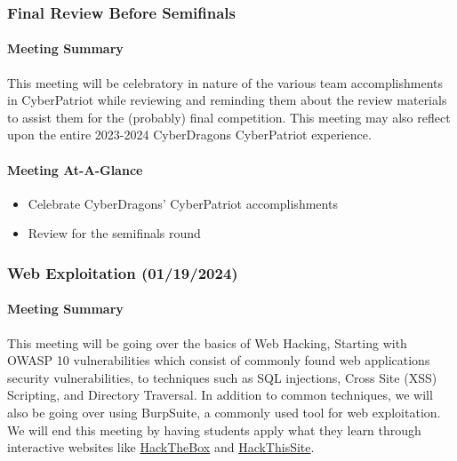 \documentclass[
  letterpaper,
  DIV=11,
  numbers=noendperiod]{scrartcl}
\let\oldparagraph\paragraph
\renewcommand{\paragraph}[1]{\oldparagraph{#1}\mbox{}}
\providecommand{\tightlist}{%
  \setlength{\itemsep}{0pt}\setlength{\parskip}{0pt}}\usepackage{longtable,booktabs,array}
\begin{document}
\newpage{}

\hypertarget{final-review-before-semifinals}{%
\subsubsection{Final Review Before
Semifinals}\label{final-review-before-semifinals}}

\hypertarget{meeting-summary-12}{%
\paragraph{Meeting Summary}\label{meeting-summary-12}}

This meeting will be celebratory in nature of the various team
accomplishments in CyberPatriot while reviewing and reminding them about
the review materials to assist them for the (probably) final
competition. This meeting may also reflect upon the entire 2023-2024
CyberDragons CyberPatriot experience.

\hypertarget{meeting-at-a-glance-12}{%
\paragraph{Meeting At-A-Glance}\label{meeting-at-a-glance-12}}

\begin{itemize}
\tightlist
\item
  Celebrate CyberDragons' CyberPatriot accomplishments
\item
  Review for the semifinals round
\end{itemize}

\hypertarget{web-exploitation-01192024}{%
\subsubsection{Web Exploitation
(01/19/2024)}\label{web-exploitation-01192024}}

\hypertarget{meeting-summary-13}{%
\paragraph{Meeting Summary}\label{meeting-summary-13}}

This meeting will be going over the basics of Web Hacking, Starting with
OWASP 10 vulnerabilities which consist of commonly found web
applications security vulnerabilities, to techniques such as SQL
injections, Cross Site (XSS) Scripting, and Directory Traversal. In
addition to common techniques, we will also be going over using
BurpSuite, a commonly used tool for web exploitation. We will end this
meeting by having students apply what they learn through interactive
websites like \href{https://www.hackthebox.com/}{HackTheBox} and
\href{https://www.hackthissite.org/}{HackThisSite}.
\end{document}
